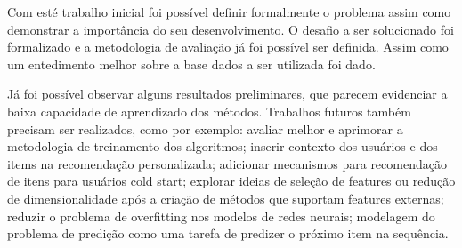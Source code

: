 \documentclass{article}
\begin{document}
Com esté trabalho inicial foi possível definir formalmente o problema assim como demonstrar a importância do seu desenvolvimento. O desafio a ser solucionado foi formalizado e a metodologia de avaliação já foi possível ser definida. Assim como um entedimento melhor sobre a base dados a ser utilizada foi dado.

Já foi possível observar alguns resultados preliminares, que parecem evidenciar a baixa capacidade de aprendizado dos métodos. Trabalhos futuros também precisam ser realizados, como por exemplo: avaliar melhor e aprimorar a metodologia de treinamento dos algoritmos; inserir contexto dos usuários e dos items na recomendação personalizada; adicionar mecanismos para recomendação de itens para usuários cold start; explorar ideias de seleção de features ou redução de dimensionalidade após a criação de métodos que suportam features externas; reduzir o problema de overfitting nos modelos de redes neurais; modelagem do problema de predição como uma tarefa de predizer o próximo item na sequência.



\end{document}
